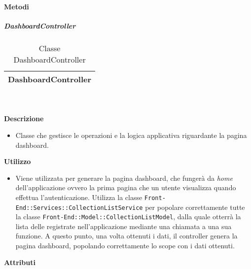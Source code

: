 		\textbf{Metodi} 
	\begin{itemize}
		\end{itemize}
			\subparagraph{DashboardController} 
\begin{table}[ht]
\begin{center}
\bgroup
	\setlength{\arrayrulewidth}{0.6mm}
	\def\arraystretch{1}
		\begin{tabular}{ | p{12cm} | }
				\hline  
					\centerline{\textbf{DashboardController}}
		\\ \hline 
				\hline
				\hline
		
		\end{tabular}
\egroup
\caption{Classe DashboardController}
\end{center}
\end{table}  \textbf{\\ \\ Descrizione} 
					\begin{itemize}
						\item[] Classe che gestisce le operazioni e la logica applicativa riguardante la pagina dashboard.
					\end{itemize}      
				\textbf{Utilizzo}  
					\begin{itemize}
						\item[] Viene utilizzata per generare la pagina dashboard, che fungerà da \textit{home} dell'applicazione ovvero la prima pagina che un utente visualizza quando effettua l'autenticazione. Utilizza la classe \texttt{Front-End::Services::CollectionListService} per popolare correttamente tutte la classe \texttt{Front-End::Model::CollectionListModel}, dalla quale otterrà la lista delle  registrate nell'applicazione mediante una chiamata a una sua funzione. A questo punto, una volta ottenuti i dati, il controller genera la pagina dashboard, popolando correttamente lo scope con i dati ottenuti.
					\end{itemize}
			 \textbf{Attributi} 
	\begin{itemize}
		\end{itemize}
		
